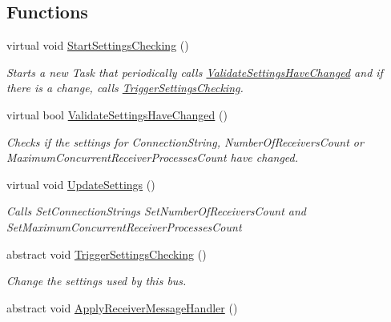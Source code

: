 \subsection*{Functions}
\begin{DoxyCompactItemize}
\item 
virtual void \hyperlink{namespaceCqrs_1_1Azure_1_1ServiceBus_a1ffbd6130b93b75aa96df68785095005_a1ffbd6130b93b75aa96df68785095005}{Start\+Settings\+Checking} ()
\begin{DoxyCompactList}\small\item\em Starts a new Task that periodically calls \hyperlink{namespaceCqrs_1_1Azure_1_1ServiceBus_aebfac0bf6d0753beaaea84b503e15d65_aebfac0bf6d0753beaaea84b503e15d65}{Validate\+Settings\+Have\+Changed} and if there is a change, calls \hyperlink{namespaceCqrs_1_1Azure_1_1ServiceBus_aa78bd82559437763c00791bd3a3b8f10_aa78bd82559437763c00791bd3a3b8f10}{Trigger\+Settings\+Checking}. \end{DoxyCompactList}\item 
virtual bool \hyperlink{namespaceCqrs_1_1Azure_1_1ServiceBus_aebfac0bf6d0753beaaea84b503e15d65_aebfac0bf6d0753beaaea84b503e15d65}{Validate\+Settings\+Have\+Changed} ()
\begin{DoxyCompactList}\small\item\em Checks if the settings for Connection\+String, Number\+Of\+Receivers\+Count or Maximum\+Concurrent\+Receiver\+Processes\+Count have changed. \end{DoxyCompactList}\item 
virtual void \hyperlink{namespaceCqrs_1_1Azure_1_1ServiceBus_ae981847eb5a6c2f22ab7d780ae318be5_ae981847eb5a6c2f22ab7d780ae318be5}{Update\+Settings} ()
\begin{DoxyCompactList}\small\item\em Calls Set\+Connection\+Strings Set\+Number\+Of\+Receivers\+Count and Set\+Maximum\+Concurrent\+Receiver\+Processes\+Count \end{DoxyCompactList}\item 
abstract void \hyperlink{namespaceCqrs_1_1Azure_1_1ServiceBus_aa78bd82559437763c00791bd3a3b8f10_aa78bd82559437763c00791bd3a3b8f10}{Trigger\+Settings\+Checking} ()
\begin{DoxyCompactList}\small\item\em Change the settings used by this bus. \end{DoxyCompactList}\item 
abstract void \hyperlink{namespaceCqrs_1_1Azure_1_1ServiceBus_a812c1b0eac09f5352b585f4ac55afeb2_a812c1b0eac09f5352b585f4ac55afeb2}{Apply\+Receiver\+Message\+Handler} ()
\end{DoxyCompactItemize}


